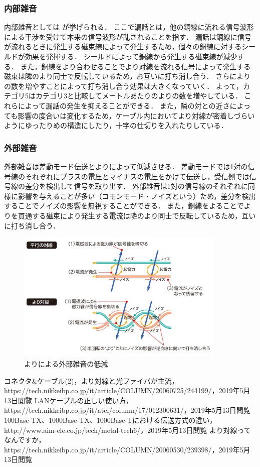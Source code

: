 \documentclass[a4paper]{ltjsarticle}
\begin{document}
\subsubsection{内部雑音}\label{ux5185ux90e8ux96d1ux97f3}

内部雑音としては  が挙げられる．
ここで漏話とは，他の銅線に流れる信号波形による干渉を受けて本来の信号波形が乱されることを指す．
漏話は銅線に信号が流れるときに発生する磁束線によって発生するため，個々の銅線に対するシールドが効果を発揮する．
シールドによって銅線から発生する磁束線が減少する．
また，銅線をより合わせることでより対線を流れる信号によって発生する磁束は隣のより同士で反転しているため，お互いに打ち消し合う．
さらによりの数を増やすことによって打ち消し合う効果は大きくなっていく．
よって，カテゴリ5はカテゴリ3と比較してメートルあたりのよりの数を増やしている．
これらによって漏話の発生を抑えることができる．
また，隣の対との近さによっても影響の度合いは変化するため，ケーブル内においてより対線が密着しづらいようにゆったりめの構造にしたり，十字の仕切りを入れたりしている．

\subsubsection{外部雑音}\label{ux5916ux90e8ux96d1ux97f3}

外部雑音は差動モード伝送とよりによって低減させる．
差動モードでは1対の信号線のそれぞれにプラスの電圧とマイナスの電圧をかけて伝送し，受信側では信号線の差分を検出して信号を取り出す．
外部雑音は1対の信号線のそれぞれに同様に影響を与えることが多い（コモンモード・ノイズという）ため，差分を検出することでノイズの影響を無視することができる．
また，銅線をよることでよりを貫通する磁束により発生する電流は隣のより同士で反転しているため，互いに打ち消し合う．

\begin{figure}[H]
  \centering
  \includegraphics[width=10cm]{out_noise.jpg}
  \caption{よりによる外部雑音の低減\cite{2}}
\end{figure}

\begin{thebibliography}{9}
   コネクタ\&ケーブル(2)，より対線と光ファイバが主流，https://tech.nikkeibp.co.jp/it/article/COLUMN/20060725/244199/，2019年5月13日閲覧
   LANケーブルの正しい使い方，https://tech.nikkeibp.co.jp/it/atcl/column/17/012300631/，2019年5月13日閲覧
   100Base-TX、1000Base-TX、1000Base-Tにおける伝送方式の違い，http://www.aim-ele.co.jp/tech/metal-tech6/，2019年5月13日閲覧
   より対線ってなんですか，https://tech.nikkeibp.co.jp/it/article/COLUMN/20060530/239398/，2019年5月13日閲覧
\end{thebibliography}
\end{document}
